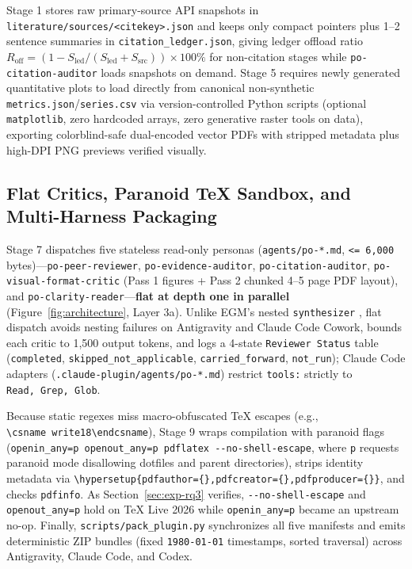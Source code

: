 Stage 1 stores raw primary-source API snapshots in \texttt{literature/\allowbreak{}sources/\allowbreak{}\textless{}citekey\textgreater{}.json} and keeps only compact pointers plus 1--2 sentence summaries in \texttt{citation\_\allowbreak{}ledger.\allowbreak{}json}, giving ledger offload ratio \(R_{\text{off}} = (1 - S_{\text{led}} / (S_{\text{led}} + S_{\text{src}})) \times 100\%\) for non-citation stages while \texttt{po-citation-auditor} loads snapshots on demand. Stage 5 requires newly generated quantitative plots to load directly from canonical non-synthetic \texttt{metrics.\allowbreak{}json}/\allowbreak{}\texttt{series.\allowbreak{}csv} via version-controlled Python scripts (optional \texttt{matplotlib}, zero hardcoded arrays, zero generative raster tools on data), exporting colorblind-safe dual-encoded vector PDFs with stripped metadata plus high-DPI PNG previews verified visually.

\subsection{Flat Critics, Paranoid TeX Sandbox, and Multi-Harness Packaging}\label{sec:method-critics}

Stage 7 dispatches five stateless read-only personas (\texttt{agents/\allowbreak{}po-*.md}, \texttt{\textless{}=\ 6,\allowbreak{}000} bytes)---\texttt{po-peer-reviewer}, \texttt{po-evidence-auditor}, \texttt{po-citation-auditor}, \texttt{po-visual-format-critic} (Pass 1 figures + Pass 2 chunked 4--5 page PDF layout), and \texttt{po-clarity-reader}---\textbf{flat at depth one in parallel} (Figure~\ref{fig:architecture}, Layer 3a). Unlike EGM's nested \texttt{synthesizer} \citep{google2026egm}, flat dispatch avoids nesting failures on Antigravity and Claude Code Cowork, bounds each critic to 1,500 output tokens, and logs a 4-state \texttt{Reviewer\ Status} table (\texttt{completed}, \texttt{skipped\_\allowbreak{}not\_\allowbreak{}applicable}, \texttt{carried\_\allowbreak{}forward}, \texttt{not\_\allowbreak{}run}); Claude Code adapters (\texttt{.claude-plugin/\allowbreak{}agents/\allowbreak{}po-*.md}) restrict \texttt{tools:} strictly to \texttt{Read,\allowbreak{}\ Grep,\allowbreak{}\ Glob}.

Because static regexes miss macro-obfuscated TeX escapes (e.g., \texttt{\textbackslash{}csname\ write18\textbackslash{}endcsname}), Stage 9 wraps compilation with paranoid flags (\texttt{openin\_\allowbreak{}any=p\ openout\_\allowbreak{}any=p\ pdflatex\ \mbox{-{}-}no-\allowbreak{}shell-escape}, where \texttt{p} requests paranoid mode disallowing dotfiles and parent directories), strips identity metadata via \texttt{\textbackslash{}hypersetup\{pdfauthor=\{\},\allowbreak{}pdfcreator=\{\},\allowbreak{}pdfproducer=\{\}\}}, and checks \texttt{pdfinfo}. As Section~\ref{sec:exp-rq3} verifies, \texttt{\mbox{-{}-}no-\allowbreak{}shell-escape} and \texttt{openout\_\allowbreak{}any=p} hold on TeX Live 2026 while \texttt{openin\_\allowbreak{}any=p} became an upstream no-op. Finally, \texttt{scripts/\allowbreak{}pack\_\allowbreak{}plugin.\allowbreak{}py} synchronizes all five manifests and emits deterministic ZIP bundles (fixed \texttt{1980-01-01} timestamps, sorted traversal) across Antigravity, Claude Code, and Codex.
